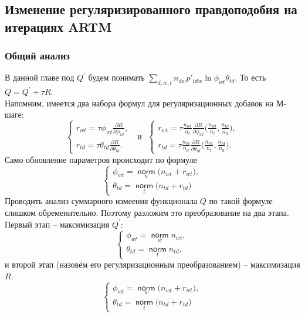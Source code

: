 \documentclass[12pt]{article}
\newcommand{\norm}{\mathop{\mathsf{norm}}\limits}
\begin{document}
	\subsection{Изменение регуляризированного правдоподобия на итерациях ARTM}
	\subsubsection{Общий анализ}
В данной главе под $Q^{\prime}$ будем понимать $\sum\limits_{d, w, t} n_{dw} p'_{tdw} \ln{\phi_{wt}\theta_{td}}$. То есть $Q = Q^{\prime} + \tau R$.\\
Напомним, имеется  два набора формул для регуляризационных добавок на М-шаге:
\[
\left\{
	\begin{aligned}
		r_{wt}= \tau\phi_{wt} \frac{\partial{R}}{\partial{\phi_{wt}}},\\
		r_{td} = \tau\theta_{td} \frac{\partial{R}}{\partial{\theta_{td}}}.
	\end{aligned}
\right.
\text{~~и~~}
\left\{
	\begin{aligned}
		r_{wt} = \tau \frac{n_{wt}}{n_t} \frac{\partial{R}}{\partial{\phi_{wt}}} \biggl(\frac{n_{wt}}{n_t}, \frac{n_{td}}{n_d}\biggr),\\
		r_{td}= \tau \frac{n_{td}}{n_d} \frac{\partial{R}}{\partial{\theta_{td}}} \biggl(\frac{n_{wt}}{n_t}, \frac{n_{td}}{n_d}\biggr).
	\end{aligned}
\right.
\]
Само обновление параметров происходит по формуле 
\[
\left\{
\begin{aligned}
 \phi_{wt}  = \norm_w \bigl(n_{wt} + r_{wt} \bigr),\\
\theta_{td} = \norm_t  \bigl(n_{td} + r_{td}\bigr)
\end{aligned}
\right.
\]
Проводить анализ суммарного измеения функционала $Q$ по такой формуле слишком обременительно. Поэтому  разложим это преобразование на два этапа. Первый этап -- максимизация $Q^{\prime}$:
\[
\left\{
	\begin{aligned}
		\phi_{wt} = \norm_w  n_{wt},\\
		\theta_{td} = \norm_t n_{td} .
	\end{aligned}
\right.
\]
и второй этап (назовём его регуляризационным преобразованием) -- максимизация $R$:
\[
\left\{
\begin{aligned}
 \phi_{wt}  = \norm_w \bigl(n_{wt} + r_{wt} \bigr),\\
\theta_{td} = \norm_t  \bigl(n_{td} + r_{td}\bigr)
\end{aligned}
\right.
\]
\end{document}

